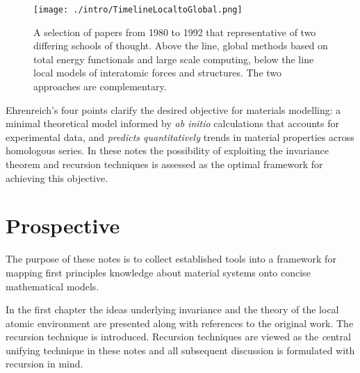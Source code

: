 \begin{figure}
\texttt{[image: ./intro/TimelineLocaltoGlobal.png]}
\caption{A selection of papers from 1980 to 1992 that representative of two differing schools of thought. 
Above the line, global methods based on total energy functionals and large scale computing, below the 
line local models of interatomic forces and structures. The two approaches are complementary.}
\end{figure}


Ehrenreich's four points clarify the desired objective for materials modelling:
a minimal theoretical model informed by {\it ab initio} calculations that accounts for 
experimental data, and {\it predicts quantitatively} trends in material properties
across homologous series. In these notes the possibility of exploiting the invariance theorem 
and recursion techniques is assessed as the optimal framework
for achieving this objective. 

\section{Prospective}
The purpose of these notes is to collect established tools into 
a framework for mapping first principles knowledge about material systems 
onto concise mathematical models. 

In the first chapter the ideas underlying invariance and the 
theory of the local atomic environment are presented along with references
to the original work. The recursion technique is introduced. 
Recursion techniques are viewed as the {\emph central unifying technique} in these
notes and all subsequent discussion is formulated with recursion in mind.


